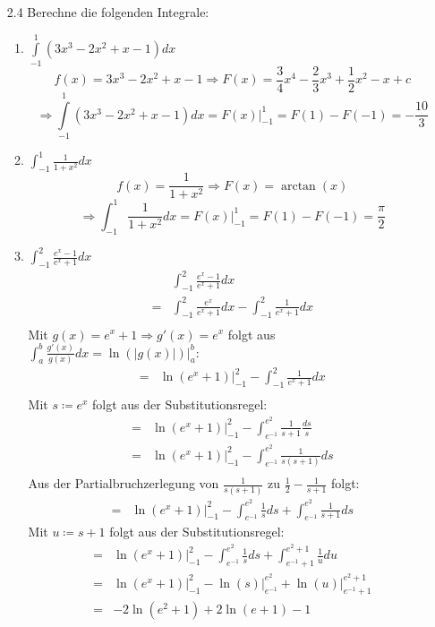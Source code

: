 \documentclass{HM}
\begin{document}
	\begin{enumerate}
		\item[2.4] Berechne die folgenden Integrale:
		\begin{enumerate}
			\item $\int\limits_{-1}^1(3x^3-2x^2+x-1)dx$
			$$f(x)=3x^3-2x^2+x-1 \Rightarrow F(x)=\frac{3}{4}x^4-\frac{2}{3}x^3+\frac{1}{2}x^2-x+c$$
			$$\Rightarrow\int\limits_{-1}^1(3x^3-2x^2+x-1)dx = F(x)\biggr|_{-1}^1 = F(1)-F(-1) = -\frac{10}{3}$$
			\item $\int_{-1}^1\frac{1}{1+x^2}dx$
			$$f(x)=\frac{1}{1+x^2} \Rightarrow F(x)=\arctan(x)$$
			$$\Rightarrow\int_{-1}^1\frac{1}{1+x^2}dx=F(x)\biggr|_{-1}^1 = F(1)-F(-1)=\frac{\pi}{2}$$
			\item $\int_{-1}^2\frac{e^x-1}{e^x+1}dx$
			\begin{align*}
				&\int_{-1}^2\frac{e^x-1}{e^x+1}dx\\
				=&\int_{-1}^2\frac{e^x}{e^x+1}dx-\int_{-1}^2\frac{1}{e^x+1}dx\\
			\end{align*}
			Mit $g(x)=e^x+1\Rightarrow g'(x)=e^x$ folgt aus $\int_a^b\frac{g'(x)}{g(x)}dx = \ln(|g(x)|)\biggr|_a^b$:
			\begin{align*}
				=&\ln(e^x+1)\biggr|_{-1}^2-\int_{-1}^2\frac{1}{e^x+1}dx\\
			\end{align*}
			Mit $s\coloneqq e^x$ folgt aus der Substitutionsregel:
			\begin{align*}
				=&\ln(e^x+1)\biggr|_{-1}^2-\int_{e^{-1}}^{e^2}\frac{1}{s+1}\frac{ds}{s}\\
				=&\ln(e^x+1)\biggr|_{-1}^2-\int_{e^{-1}}^{e^2}\frac{1}{s(s+1)}ds\\
			\end{align*}
			Aus der Partialbruchzerlegung von $\frac{1}{s(s+1)}$ zu $\frac{1}{2}-\frac{1}{s+1}$ folgt:
			\begin{align*}
				=&\ln(e^x+1)\biggr|_{-1}^2-\int_{e^{-1}}^{e^2}\frac{1}{s}ds+\int_{e^{-1}}^{e^2}\frac{1}{s+1}ds
			\end{align*}
			Mit $u\coloneqq s+1$ folgt aus der Substitutionsregel:
			\begin{align*}
				=&\ln(e^x+1)\biggr|_{-1}^2-\int_{e^{-1}}^{e^2}\frac{1}{s}ds+\int_{e^{-1}+1}^{e^2+1}\frac{1}{u}du\\
				=&\ln(e^x+1)\biggr|_{-1}^2-\ln(s)\biggr|_{e^{-1}}^{e^2}+\ln(u)\biggr|_{e^{-1}+1}^{e^2+1}\\
				=&-2\ln(e^2+1)+2\ln(e+1)-1
			\end{align*}

\end{enumerate}
\end{enumerate}
\end{document}
